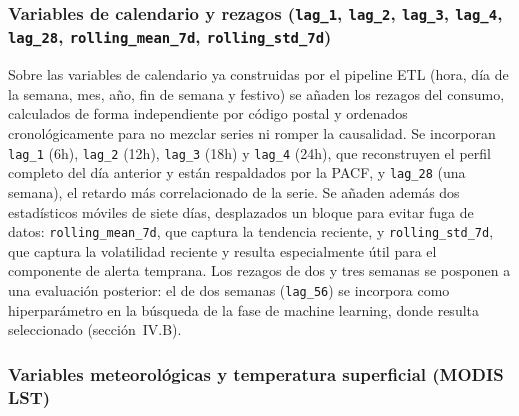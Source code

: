 \documentclass[12pt, a4paper]{article}
\begin{document}
\subsubsection{Variables de calendario y rezagos (\texttt{lag\_1}, \texttt{lag\_2}, \texttt{lag\_3}, \texttt{lag\_4}, \texttt{lag\_28}, \texttt{rolling\_mean\_7d}, \texttt{rolling\_std\_7d})}

Sobre las variables de calendario ya construidas por el pipeline ETL (hora, día de la semana, mes, año, fin de semana y festivo) se añaden los rezagos del consumo, calculados de forma independiente por código postal y ordenados cronológicamente para no mezclar series ni romper la causalidad. Se incorporan \texttt{lag\_1} (6h), \texttt{lag\_2} (12h), \texttt{lag\_3} (18h) y \texttt{lag\_4} (24h), que reconstruyen el perfil completo del día anterior y están respaldados por la PACF, y \texttt{lag\_28} (una semana), el retardo más correlacionado de la serie. Se añaden además dos estadísticos móviles de siete días, desplazados un bloque para evitar fuga de datos: \texttt{rolling\_mean\_7d}, que captura la tendencia reciente, y \texttt{rolling\_std\_7d}, que captura la volatilidad reciente y resulta especialmente útil para el componente de alerta temprana. Los rezagos de dos y tres semanas se posponen a una evaluación posterior: el de dos semanas (\texttt{lag\_56}) se incorpora como hiperparámetro en la búsqueda de la fase de machine learning, donde resulta seleccionado (sección~IV.B).

\subsubsection{Variables meteorológicas y temperatura superficial (MODIS LST)}
\end{document}

